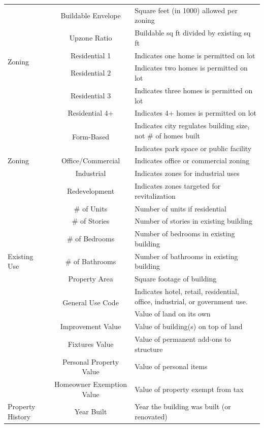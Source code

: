 \documentclass[a4paper,12pt]{article}
\begin{document}
\begin{longtable}{|p{1.6cm}|c|p{7cm}|}
\hline
\multirow{6}{2cm}{Zoning} & Buildable Envelope & Square feet (in 1000) allowed per zoning \\
& Upzone Ratio & Buildable sq ft divided by existing sq ft\\
& Residential 1 & Indicates one home is permitted on lot\\
& Residential 2 & Indicates two homes is permitted on lot\\
& Residential 3 & Indicates three homes is permitted on lot\\
& Residential 4+ & Indicates 4+ homes is permitted on lot\\
\multirow{5}{2cm}{Zoning} & \multirow{2}{6cm}{\centering Form-Based} & Indicates city regulates building size, not \# of homes built\\
& Public & Indicates park space or public facility \\
& Office/Commercial & Indicates office or commercial zoning \\
& Industrial & Indicates zones for industrial uses \\
& Redevelopment & Indicates zones targeted for revitalization\\
\hline
\multirow{7}{2cm}{Existing Use} & \# of Units & Number of units if residential \\
& \# of Stories & Number of stories in existing building\\
& \# of Bedrooms & Number of bedrooms in existing building\\
& \# of Bathrooms & Number of bathrooms in existing building\\
& Property Area & Square footage of building\\
& \multirow{2}{6cm}{\centering General Use Code} & Indicates hotel, retail, residential, office, industrial, or government use. \\
\hline
\multirow{5}{2cm}{Property Tax} & Land Value & Value of land on its own \\
& Improvement Value & Value of building(s) on top of land \\
& Fixtures Value & Value of permanent add-ons to structure \\
& Personal Property Value & Value of personal items \\
& Homeowner Exemption Value & Value of property exempt from tax \\
\hline
\multirow{3}{2cm}{Property History}
& Year Built & Year the building was built (or renovated) \\

\end{longtable}
\end{document}
